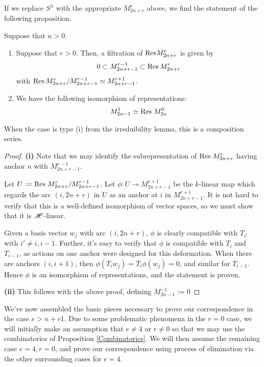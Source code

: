 \documentclass{amsart}
\begin{document}
If we replace $S^\lambda$ with the appropriate $M_{2n + r}^r$ above, we find the statement of the following proposition.
\begin{proposition}Suppose that $n > 0$.
  
  \begin{enumerate}[label={(\roman*)}]
    \item
    Suppose that $r > 0$.
    Then, a filtration of $\text{Res} M_{2n + r}^r$ is given by
    \begin{equation}
      0 \subset M_{2n + r - 1}^{r-1} \subset \text{Res} \, M_{2n + r}^r \label{Filtration}
     \end{equation}
     with $\text{Res} \, M_{2n + r}^r / M_{2n + r - 1}^{r-1} \simeq M_{2n + r - 1}^{r + 1}$. 
    \item
      We have the following isomorphism of representations:
      \begin{equation}
        M_{2n - 1}^1 \simeq \text{Res} \; M_{2n}^0 \label{0 Restriction}
       \end{equation}
  \end{enumerate}
    When the case is type (i) from the irreduibility lemma, this is a composition series.
\end{proposition}
\begin{proof}
  \textbf{(i)}
  Note that we may identify the subrepresentation of $\text{Res} \; M_{2n + r}^r$ having anchor $n$ with $M_{2n + r - 1}^{r-1}$.
  
  Let $U := \text{Res} \; M_{2n + r}^r / M_{2n + r - 1}^{r - 1}$. 
  Let $\phi:U \rightarrow M_{2n + r - 1}^{r + 1}$ be the $k$-linear map which regards the arc $(i,2n + r)$ in $U$ as an anchor at $i$ in $M_{2n + r - 1}^{r + 1}$.
  It is not hard to verify that this is a well-defined isomorphism of vector spaces, so we must show that it is $\mathscr{H}$-linear.

  Given a basis vector $w_j$ with arc $(i,2n + r)$, $\phi$ is clearly compatible with $T_{i'}$ with $i' \neq i,i-1$.
  Further, it's easy to verify that $\phi$ is compatible with $T_{i}$ and $T_{i-1}$, as actions on one anchor were designed for this deformation.
  When there are anchors $(i,i+1)$, then $\phi(T_iw_j) = T_i\phi(w_j) = 0$, and similar for $T_{i -1}$.
  Hence $\phi$ is an isomorphism of representations, and the statement is proven.

  \textbf{(ii)}
  This follows with the above proof, defining $M_{2n - 1}^{-1} := 0$
\end{proof}

We've now assembled the basic pieces necessary to prove our correspondence in the case $e > n + r  1$.
Due to some problematic phenomena in the $r = 0$ case, we will initially make an assumption that $e \neq 4$ or $r \neq 0$ so that we may use the combinatorics of Proposition \ref{Combinatorics}.
We will then assume the remaining case $e = 4, r = 0$, and prove our correspondence using process of elimination via the other surrounding cases for $e = 4$.
\end{document}
